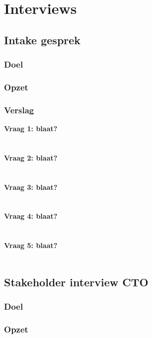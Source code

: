 
\chapter{Interviews}

\section{Intake gesprek}
\subsection{Doel}
\subsection{Opzet}
\subsection{Verslag}
\textbf{Vraag 1: blaat?}\\
\lipsum[01]\\
\\
\textbf{Vraag 2: blaat?}\\
\lipsum[02]\\
\\
\textbf{Vraag 3: blaat?}\\
\lipsum[03]\\
\\
\textbf{Vraag 4: blaat?}\\
\lipsum[04]\\
\\
\textbf{Vraag 5: blaat?}\\
\lipsum[05]\\

\section{Stakeholder interview CTO}
\subsection{Doel}
\subsection{Opzet}
